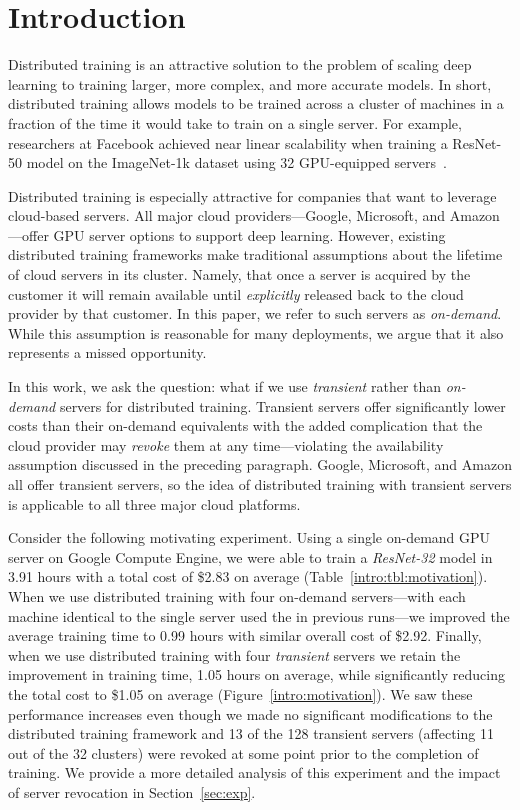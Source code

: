 \section{Introduction}
\label{sec:intro}

Distributed training is an attractive solution to the problem of scaling deep
learning to training larger, more complex, and more accurate models. In short,
distributed training allows models to be trained across a cluster of machines
in a fraction of the time it would take to train on a single server. For
example, researchers at Facebook achieved near linear scalability when training
a ResNet-50 model on the ImageNet-1k dataset using 32 GPU-equipped
servers~\cite{goyal2017accurate}.

Distributed training is especially attractive for companies that want to
leverage cloud-based servers.  All major cloud providers---Google, Microsoft,
and Amazon---offer GPU server options to support deep learning.  However,
existing distributed training frameworks make traditional assumptions about the
lifetime of cloud servers in its cluster. Namely, that once a server is
acquired by the customer it will remain available until \emph{explicitly} released
back to the cloud provider by that customer. In this paper, we refer to such
servers as \emph{on-demand}. While this assumption is reasonable for many
deployments, we argue that it also represents a missed opportunity.   

In this work, we ask the question: what if we use \emph{transient} rather than
\emph{on-demand} servers for distributed training.  Transient servers offer
significantly lower costs than their on-demand equivalents with the added
complication that the cloud provider may \emph{revoke} them at any time---violating the
availability assumption discussed in the preceding paragraph.  Google,
Microsoft, and Amazon all offer transient servers, so the idea of 
distributed training with transient servers is applicable to all three major
cloud platforms.

Consider the following motivating experiment. Using a single on-demand GPU
server on Google Compute Engine, we were able to train a \emph{ResNet-32} model in 3.91 hours
with a total cost of \$2.83 on average (Table~\ref{intro:tbl:motivation}). When we use distributed training with
four on-demand servers---with each machine identical to the single server used 
the in previous runs---we improved the average training time to 0.99 hours
with similar overall cost of \$2.92. Finally, when we use distributed training
with four \emph{transient} servers we retain the improvement in training time,
1.05 hours on average, while significantly reducing the total cost to \$1.05 on
average (Figure~\ref{intro:motivation}). We saw these performance increases even though we made no significant
modifications to the distributed training framework and 13 of the 128 transient
servers (affecting 11 out of the 32 clusters) were revoked at some point prior
to the completion of training. We provide a more detailed analysis of this
experiment and the impact of server revocation in Section~\ref{sec:exp}.      

